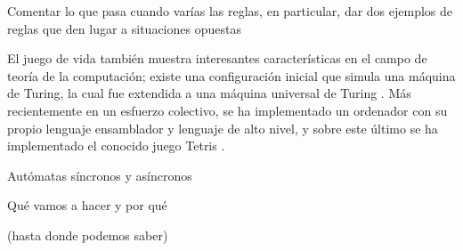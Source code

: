\documentclass[../proyecto.tex]{book}
\begin{document}
Comentar lo que pasa cuando varías las reglas, en particular, dar dos ejemplos de reglas que den lugar a situaciones opuestas

El juego de vida también muestra interesantes características en el campo de teoría de la computación; existe una configuración inicial que simula una máquina de Turing, la cual fue extendida a una máquina universal de Turing \cite{turing}. Más recientemente en un esfuerzo colectivo, se ha implementado un ordenador con su propio lenguaje ensamblador y lenguaje de alto nivel, y sobre este último se ha implementado el conocido juego Tetris \cite{tetris}.

Autómatas síncronos y asíncronos \cite{syncVSasync}

Qué vamos a hacer y por qué

(hasta donde podemos saber)
\end{document}
